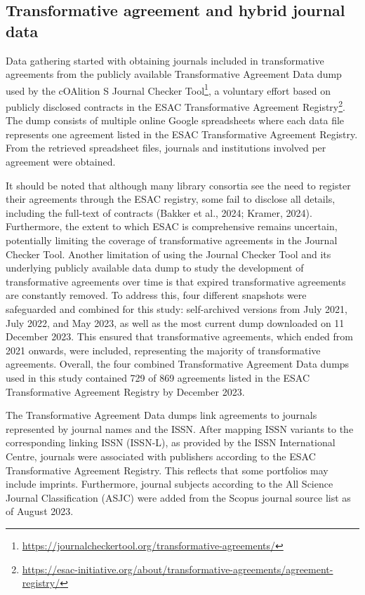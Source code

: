 \documentclass[a4paper,man,floatsintext,longtable,noextraspace,12pt]{apa6}
\begin{document}
\subsection{Transformative agreement and hybrid journal
data}\label{transformative-agreement-and-hybrid-journal-data}

Data gathering started with obtaining journals included in
transformative agreements from the publicly available Transformative
Agreement Data dump used by the cOAlition S Journal Checker
Tool\footnote{\url{https://journalcheckertool.org/transformative-agreements/}},
a voluntary effort based on publicly disclosed contracts in the ESAC
Transformative Agreement Registry\footnote{\url{https://esac-initiative.org/about/transformative-agreements/agreement-registry/}}.
The dump consists of multiple online Google spreadsheets where each data
file represents one agreement listed in the ESAC Transformative
Agreement Registry. From the retrieved spreadsheet files, journals and
institutions involved per agreement were obtained.

It should be noted that although many library consortia see the need to
register their agreements through the ESAC registry, some fail to
disclose all details, including the full-text of contracts (Bakker et
al., 2024; Kramer, 2024). Furthermore, the extent to which ESAC is
comprehensive remains uncertain, potentially limiting the coverage of
transformative agreements in the Journal Checker Tool. Another
limitation of using the Journal Checker Tool and its underlying publicly
available data dump to study the development of transformative
agreements over time is that expired transformative agreements are
constantly removed. To address this, four different snapshots were
safeguarded and combined for this study: self-archived versions from
July 2021, July 2022, and May 2023, as well as the most current dump
downloaded on 11 December 2023. This ensured that transformative
agreements, which ended from 2021 onwards, were included, representing
the majority of transformative agreements. Overall, the four combined
Transformative Agreement Data dumps used in this study contained 729 of
869 agreements listed in the ESAC Transformative Agreement Registry by
December 2023.

The Transformative Agreement Data dumps link agreements to journals
represented by journal names and the ISSN. After mapping ISSN variants
to the corresponding linking ISSN (ISSN-L), as provided by the ISSN
International Centre, journals were associated with publishers according
to the ESAC Transformative Agreement Registry. This reflects that some
portfolios may include imprints. Furthermore, journal subjects according
to the All Science Journal Classification (ASJC) were added from the
Scopus journal source list as of August 2023.
\end{document}
